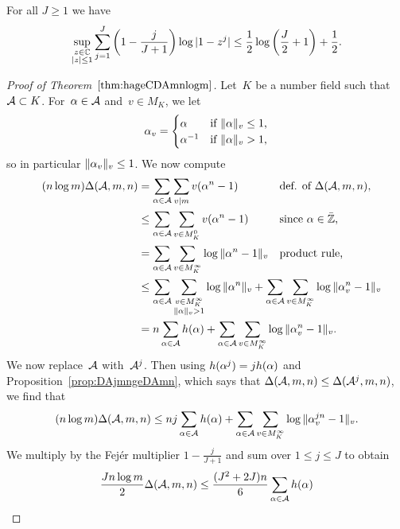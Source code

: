 \documentclass[12pt,reqno]{amsart}
\begin{document}
\begin{proposition}
\label{prop:fejarestimate}
For all $J\ge1$ we have
\[
  \sup_{\substack{z\in\mathbb{C}\\ |z|\le 1\\}} 
    \sum_{j=1}^J \left(1-\frac{j}{J+1}\right)\log|1-z^j|
  \le \frac{1}{2}\log\left(\frac{J}{2}+1\right)+\frac{1}{2}.
\]
\end{proposition}

\begin{proof}[Proof of Theorem~$\ref{thm:hageCDAmnlogm}$]
Let~$K$ be a number field such that ${\mathcal A}\subset K$.
For~$\alpha\in{\mathcal A}$ and~$v\in M_K$, we let
\[
  \alpha_v = \begin{cases}
     \alpha&\text{if $\|\alpha\|_v\le1$,}\\
     \alpha^{-1}&\text{if $\|\alpha\|_v>1$,}\\
  \end{cases}
\]
so in particular $\|\alpha_v\|_v\le 1$.  We now compute
\begin{align}
  \label{eqn:nlogmDlehlogan1v}
  (n\log m)\D(\Acal,m,n) 
  &= \sum_{\a\in\Acal}\sum_{v\mid m} v(\a^n-1)
    &&\text{def. of $\D(\Acal,m,n)$,} \notag\\
  &\le \sum_{\a\in\Acal}\sum_{v\in M_K^0} v(\a^n-1)
    &&\text{since $\a\in\bar\ZZ$,} \notag\\
  &= \sum_{\a\in\Acal}\sum_{v\in M_K^\infty} \log\|\a^n-1\|_v
    &&\text{product rule,} \notag\\
  &\le \sum_{\a\in\Acal}\sum_{\substack{v\in M_K^\infty\\\|\a\|_v>1\\}} \log\|\a^n\|_v
    +  \sum_{\a\in\Acal}\sum_{v\in M_K^\infty} \log\|\a_v^n-1\|_v \hidewidth \notag\\
  &= n\sum_{\a\in\Acal} h(\a) 
    +  \sum_{\a\in\Acal}\sum_{v\in M_K^\infty} \log\|\a_v^n-1\|_v. \hidewidth 
\end{align}
We now replace~${\mathcal A}$ with~${\mathcal A}^j$. Then using $h(\alpha^j)=jh(\alpha)$ and
Proposition~\ref{prop:DAjmngeDAmn}, which says that
$\Delta({\mathcal A},m,n)\le\Delta({\mathcal A}^j,m,n)$, we find that
\[
  (n\log m)\Delta({\mathcal A},m,n) 
  \le nj\sum_{\alpha\in{\mathcal A}}h(\alpha) 
    +  \sum_{\alpha\in{\mathcal A}}\sum_{v\in M_K^\infty} \log\|\alpha_v^{jn}-1\|_v .
\]
We multiply by the Fej\'er multiplier $1-\frac{j}{J+1}$  and sum over
$1\le j\le J$ to obtain
\begin{multline*}
  \frac{Jn\log m}{2}\D(\Acal,m,n) 
  \le \frac{(J^2+2J)n}{6}\sum_{\a\in\Acal}h(\a)  \\*

\end{multline*}
\end{proof}
\end{document}
